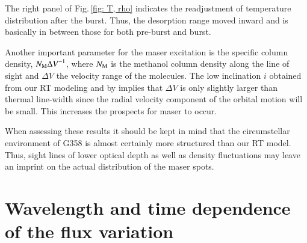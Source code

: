 The right panel of Fig.\,\ref{fig: T, rho} indicates the readjustment of temperature distribution after the burst. Thus, the desorption range moved inward and is basically in between those for both pre-burst and burst.


Another important parameter for the maser excitation is the specific column density, $N_{\rm M} {\Delta V}^{-1}$, where $N_{\rm M}$ is the methanol column density along the line of sight and ${\Delta V}$ the velocity range of the molecules. 
The low inclination $i$ obtained from our RT modeling and by \citet{2020NatAs.tmp..144C} implies that $\Delta V$ is only slightly larger than thermal line-width since the radial velocity component of the orbital motion will be small. This increases the prospects for maser to occur.

When assessing these results it should be kept in mind that the circumstellar environment of G358 is almost certainly more structured than our RT model. Thus, sight lines of lower optical depth as well as density fluctuations may leave an imprint on the actual distribution of the maser spots.

\section{Wavelength and time dependence of the flux variation}\label{wtd}


